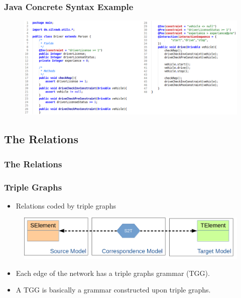 \documentclass{beamer}
\begin{document}
\begin{frame}
	\frametitle{Java Concrete Syntax Example}
	\nocite{heidenreich2009jamopp}
	\begin{figure}[H]
   		\includegraphics[width=\textwidth]{javaMetamodelExample01_Text}
	\end{figure}	
\end{frame}

\subsection{The Relations}
\begin{frame}
	\frametitle{The Relations}
\end{frame}

\begin{frame}
	\frametitle{Triple Graphs}
	\nocite{hermann2011correctness}
	\begin{itemize}
		\item Relations coded by triple graphs
	\end{itemize}
	\begin{figure}
		\includegraphics[width=.7\textwidth]{tripleGraphs}
	\end{figure}
	\pause
	\begin{itemize}
		\item Each edge of the network has a triple graphs grammar (TGG).
		\item A TGG is basically a grammar constructed upon triple graphs.
	\end{itemize}
\end{frame}
\end{document}
